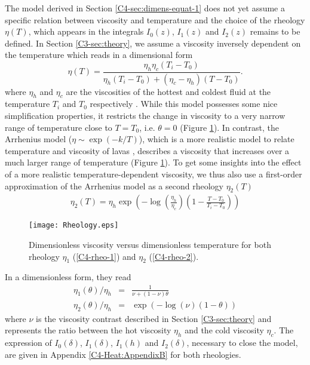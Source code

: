 The model derived in  Section \ref{C4-sec:dimens-equat-1} does not yet
assume a specific  relation between viscosity and  temperature and the
choice  of the  rheology  $\eta(T)$, which  appears  in the  integrals
$I_0(z)$, $I_1(z)$  and $I_2(z)$  remains to  be defined.   In Section
\ref{C3-sec:theory}, we assume a  viscosity inversely dependent on the
temperature which reads in a dimensional form
\begin{equation}
  \eta(T)=\frac{\eta_h
    \eta_c(T_i-T_0)}{\eta_h(T_i-T_0)+(\eta_c-\eta_h)(T-T_0)}.
\end{equation}
where $\eta_h$  and $\eta_c$  are the viscosities  of the  hottest and
coldest  fluid  at  the   temperature  $T_i$  and  $T_0$  respectively
\citep{Bercovici:2007vc}.   While  this   model  possesses  some  nice
simplification properties, it  restricts the change in  viscosity to a
very narrow  range of  temperature close  to $T=T_0$,  i.e. $\theta=0$
(Figure   \ref{C4-Rheology}).   In   contrast,  the   Arrhenius  model
($\eta \sim  \exp(-k/T)$), which is  a more realistic model  to relate
temperature and viscosity of lavas \citep{Blatt:2ViMWPc0}, describes a
viscosity  that increases  over  a much  larger  range of  temperature
(Figure \ref{C4-Rheology}).  To get some insights into the effect of a
more  realistic temperature-dependent  viscosity, we  thus also  use a
first-order approximation of the Arrhenius  model as a second rheology
$\eta_2(T)$ \citep{Diniega:2013eh}
\begin{eqnarray}
  \eta_2(T)                          =                          \eta_h
  \exp\left(-\log\left(\frac{\eta_h}{\eta_c}\right)\left(1-\frac{T-T_0}{T_i-T_0}\right)\right)
\end{eqnarray}
\begin{figure}[htbp]
  \begin{center}
    \graphicspath{ {/Users/thorey/Documents/These/Projet/Refroidissement/Skin_Model/Figure/Figure_Heating/} }
    \texttt{[image: Rheology.eps]}
    \caption{Dimensionless viscosity  versus dimensionless temperature
      for  both  rheology   $\eta_1$  (\ref{C4-rheo-1})  and  $\eta_2$
      (\ref{C4-rheo-2}).}
    \label{C4-Rheology}
  \end{center}
\end{figure}
In a dimensionless form, they read
\begin{eqnarray}
  \eta_1(\theta)/\eta_h&=&\frac{1}{\nu+(1-\nu)\theta} \label{C4-rheo-1}\\
  \eta_2(\theta)/\eta_h&=&\exp\left(-\log(\nu)\left(1-\theta\right)\right)  \label{C4-rheo-2}
\end{eqnarray}
where   $\nu$  is   the  viscosity   contrast  described   in  Section
\ref{C3-sec:theory} and represents the ratio between the hot viscosity
$\eta_h$  and   the  cold  viscosity  $\eta_c$.    The  expression  of
$I_0(\delta)$, $I_1(\delta)$, $I_1(h)$ and $I_2(\delta)$, necessary to
close  the model,  are given  in Appendix  \ref{C4-Heat:AppendixB} for
both rheologies.

